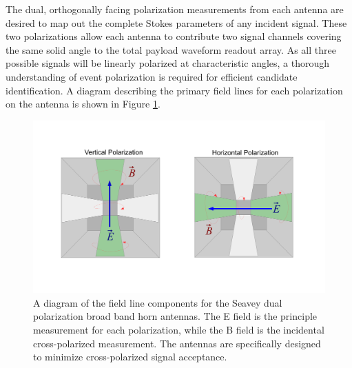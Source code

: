 	The dual, orthogonally facing polarization measurements from each antenna are desired to map out the complete Stokes parameters of any incident signal.  These two polarizations allow each antenna to contribute two signal channels covering the same solid angle to the total payload waveform readout array.  As all three possible signals will be linearly polarized at characteristic angles, a thorough understanding of event polarization is required for efficient candidate identification.  A diagram describing the primary field lines for each polarization on the antenna is shown in Figure \ref{fig:AntennaPol}.  
	
\begin{figure}
\centering
	\includegraphics[width=\textwidth]{figures/AntennaPol}
	\caption{A diagram of the field line components for the Seavey dual polarization broad band horn antennas.  The E field is the principle measurement for each polarization, while the B field is the incidental cross-polarized measurement.  The antennas are specifically designed to minimize cross-polarized signal acceptance.}
	\label{fig:AntennaPol}
\end{figure}
		
	
	

